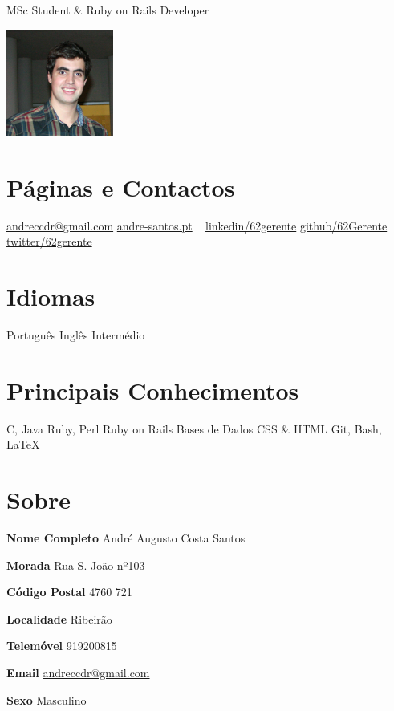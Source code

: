 \documentclass[]{friggeri-cv}
\begin{document}
       {MSc Student \& Ruby on Rails Developer}

\begin{aside}
  \includegraphics[height=100pt]{foto}
  \section{Páginas e Contactos}
    \href{mailito:andreccdr@gmail.com}{andreccdr@gmail.com}
    \href{http://andre-santos.pt}{andre-santos.pt}
    ~
    \href{http://pt.linkedin.com/in/62gerente/}{linkedin/62gerente}
    \href{https://github.com/62Gerente}{github/62Gerente}
    \href{https://twitter.com/62gerente}{twitter/62gerente}
   \section{Idiomas}
    Português
    Inglês Intermédio
  \section{Principais Conhecimentos}
    C, Java
    Ruby, Perl
    Ruby on Rails
    Bases de Dados
    CSS \& HTML
    Git, Bash, \LaTeX
\end{aside}

\section{Sobre}

\textbf{Nome Completo} André Augusto Costa Santos 

\begin{multicols}{3}
\textbf{Morada} Rua S. João nº103  

\textbf{Código Postal} 4760 721 

\textbf{Localidade} Ribeirão
\end{multicols}

\begin{multicols}{3}
\textbf{Telemóvel} 919200815  

\textbf{Email} \href{mailito:andreccdr@gmail.com}{andreccdr@gmail.com}

\textbf{Sexo} Masculino
\end{multicols}
\end{document}
